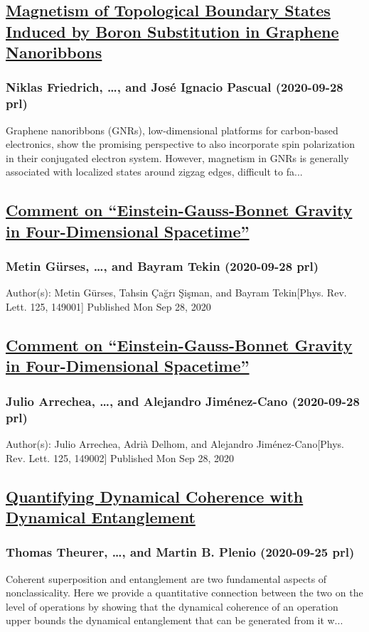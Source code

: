 \subsection*{\href{http://link.aps.org/doi/10.1103/PhysRevLett.125.146801}{Magnetism of Topological Boundary States Induced by Boron Substitution in Graphene Nanoribbons}}
\subsubsection*{Niklas Friedrich, \dots, and José Ignacio Pascual (2020-09-28 prl)}
Graphene nanoribbons (GNRs), low-dimensional platforms for carbon-based electronics, show the promising perspective to also incorporate spin polarization in their conjugated electron system. However, magnetism in GNRs is generally associated with localized states around zigzag edges, difficult to fa...
\subsection*{\href{http://link.aps.org/doi/10.1103/PhysRevLett.125.149001}{Comment on “Einstein-Gauss-Bonnet Gravity in Four-Dimensional Spacetime”}}
\subsubsection*{Metin Gürses, \dots, and Bayram Tekin (2020-09-28 prl)}
Author(s): Metin Gürses, Tahsin Çağrı Şişman, and Bayram Tekin[Phys. Rev. Lett. 125, 149001] Published Mon Sep 28, 2020
\subsection*{\href{http://link.aps.org/doi/10.1103/PhysRevLett.125.149002}{Comment on “Einstein-Gauss-Bonnet Gravity in Four-Dimensional Spacetime”}}
\subsubsection*{Julio Arrechea, \dots, and Alejandro Jiménez-Cano (2020-09-28 prl)}
Author(s): Julio Arrechea, Adrià Delhom, and Alejandro Jiménez-Cano[Phys. Rev. Lett. 125, 149002] Published Mon Sep 28, 2020
\subsection*{\href{http://link.aps.org/doi/10.1103/PhysRevLett.125.130401}{Quantifying Dynamical Coherence with Dynamical Entanglement}}
\subsubsection*{Thomas Theurer, \dots, and Martin B. Plenio (2020-09-25 prl)}
Coherent superposition and entanglement are two fundamental aspects of nonclassicality. Here we provide a quantitative connection between the two on the level of operations by showing that the dynamical coherence of an operation upper bounds the dynamical entanglement that can be generated from it w...
